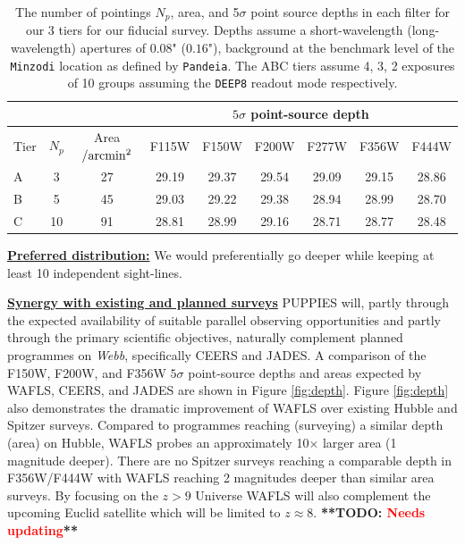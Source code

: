 \documentclass[12pt]{article}
\newcommand{\todo}[1]{\textbf{**TODO: \textcolor{red}{#1}**}}
\begin{document}
\begin{table}[h!]
\begin{center}
\begin{tabular}{ |l|c|c|c|c|c|c|c|c| } 
\hline
\multicolumn{3}{|c|}{} & \multicolumn{6}{|c|}{$5\sigma$ point-source depth} \\
 \hline
Tier & $N_{p}$ & Area$/{\rm arcmin^2}$ & F115W & F150W & F200W & F277W & F356W & F444W \\
\hline
A & 3 & 27 & 29.19 & 29.37 & 29.54 & 29.09 & 29.15 & 28.86 \\
B & 5 & 45 & 29.03 & 29.22 & 29.38 & 28.94 & 28.99 & 28.70 \\
C & 10 & 91 & 28.81 & 28.99 & 29.16 & 28.71 & 28.77 & 28.48 \\
\hline
\end{tabular}
\end{center}
\vspace{-5mm}
\caption{The number of pointings $N_p$, area, and 5$\sigma$ point source depths in each filter for our 3 tiers for our fiducial survey.  Depths assume a short-wavelength (long-wavelength) apertures of $0.08$" ($0.16$"), background at the benchmark level of the \texttt{Minzodi} location as defined by \texttt{Pandeia}. The ABC tiers assume 4, 3, 2 exposures of 10 groups assuming the \texttt{DEEP8} readout mode respectively.}
\end{table}

\noindent
\underline{\bf Preferred distribution:} We would preferentially go deeper while keeping at least 10 independent sight-lines. 


\noindent
\underline{\bf Synergy with existing and planned surveys} PUPPIES will, partly through the expected availability of suitable parallel observing opportunities and partly through the primary scientific objectives, naturally complement planned programmes on \emph{Webb}, specifically CEERS and JADES. A comparison of the F150W, F200W, and F356W $5\sigma$ point-source depths and areas expected by WAFLS, CEERS, and JADES are shown in Figure \ref{fig:depth}. Figure \ref{fig:depth} also demonstrates the dramatic improvement of WAFLS over existing Hubble and Spitzer surveys. Compared to programmes reaching (surveying) a similar depth (area) on Hubble, WAFLS probes an approximately 10$\times$ larger area (1 magnitude deeper). There are no Spitzer surveys reaching a comparable depth in F356W/F444W with WAFLS reaching 2 magnitudes deeper than similar area surveys. By focusing on the $z>9$ Universe WAFLS will also complement the upcoming Euclid satellite which will be limited to $z\approx 8$. \todo{Needs updating}
\end{document}
